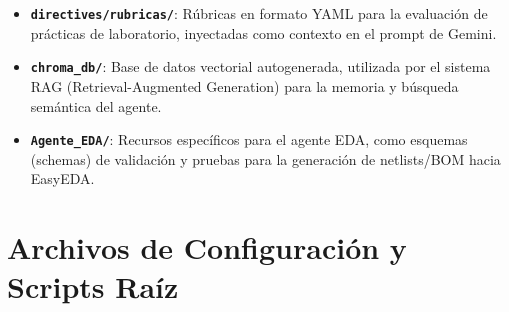 \documentclass[12pt,a4paper]{article}
\begin{document}
\begin{itemize}
    \item \textbf{\texttt{directives/rubricas/}}: Rúbricas en formato YAML para la evaluación de prácticas de laboratorio, inyectadas como contexto en el prompt de Gemini.
    \item \textbf{\texttt{chroma\_db/}}: Base de datos vectorial autogenerada, utilizada por el sistema RAG (Retrieval-Augmented Generation) para la memoria y búsqueda semántica del agente.
    \item \textbf{\texttt{Agente\_EDA/}}: Recursos específicos para el agente EDA, como esquemas (schemas) de validación y pruebas para la generación de netlists/BOM hacia EasyEDA.
\end{itemize}

\section{Archivos de Configuración y Scripts Raíz}
\end{document}
